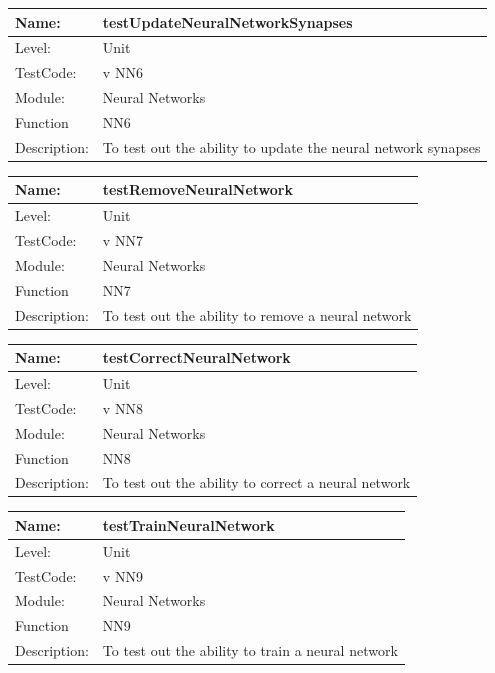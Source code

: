 \documentclass[12pt]{article}
\begin{document}
\begin{flushleft}
\begin{center}
\begin{tabular}{|l|p{12cm}|}
\hline

 Name: & testUpdateNeuralNetworkSynapses \\
 \hline
Level: & Unit \\
\hline
TestCode: & v NN6 \\
\hline
Module:& Neural Networks \\
\hline
Function & NN6 \\
\hline
Description: & To test out the ability to update the neural network synapses  \\
\hline
\end{tabular}
\end{center}

\begin{center}
\begin{tabular}{|l|p{12cm}|}
\hline

 Name: & testRemoveNeuralNetwork \\
 \hline
Level: & Unit \\
\hline
TestCode: & v NN7 \\
\hline
Module:& Neural Networks \\
\hline
Function & NN7 \\
\hline
Description: & To test out the ability to remove a neural network   \\
\hline
\end{tabular}
\end{center}


\begin{center}
\begin{tabular}{|l|p{12cm}|}
\hline

 Name: & testCorrectNeuralNetwork \\
 \hline
Level: & Unit \\
\hline
TestCode: & v NN8 \\
\hline
Module:& Neural Networks \\
\hline
Function & NN8 \\
\hline
Description: & To test out the ability to correct a neural network   \\
\hline
\end{tabular}
\end{center}


\begin{center}
\begin{tabular}{|l|p{12cm}|}
\hline

 Name: & testTrainNeuralNetwork \\
 \hline
Level: & Unit \\
\hline
TestCode: & v NN9 \\
\hline
Module:& Neural Networks \\
\hline
Function & NN9 \\
\hline
Description: & To test out the ability to train a neural network   \\
\hline
\end{tabular}
\end{center}


\end{flushleft}
\end{document}
